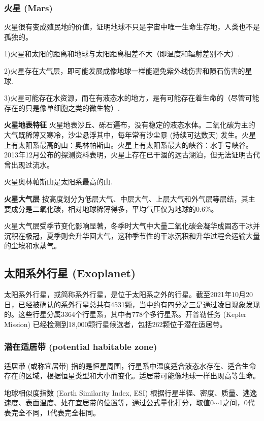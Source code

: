 \documentclass[12pt,a4paper]{article}
\begin{document}
	\subsubsection{火星 (Mars)}
	
	火星很有变成殖民地的价值，证明地球不只是宇宙中唯一生命生存地，人类也不是孤独的。
	
	1)火星和太阳的距离和地球与太阳距离相差不大（即温度和辐射差别不大）.
	
	2)火星存在大气层，即可能发展成像地球一样能避免紫外线伤害和陨石伤害的星球.
	
	3)火星可能存在水资源，而在有液态水的地方，是有可能存在着生命的（尽管可能存在的只是像单细胞之类的微生物）.
	
	\textbf{火星地表特征} 火星地表沙丘、砾石遍布，没有稳定的液态水体。二氧化碳为主的大气既稀薄又寒冷，沙尘悬浮其中，每年常有沙尘暴 (持续可达数天) 发生。火星上有太阳系最高的山：奥林帕斯山。火星上有太阳系最大的峡谷：水手号峡谷。2013年12月公布的探测资料表明，火星上存在已干涸的远古湖泊，但无法证明古代曾出现过流水。
	
	火星奥林帕斯山是太阳系最高的山.
	
	\textbf{火星大气层} 按高度划分为低层大气、中层大气、上层大气和外气层等层结，其主要成分是二氧化碳，相对地球稀薄得多，平均气压仅为地球的0.6\%。
	
	火星大气层受季节变化影响显著，冬季时大气中大量二氧化碳会凝华成固态干冰并沉积在极冠，夏季则会升华回大气，这种季节性的干冰沉积和升华过程会运输大量的尘埃和水蒸气。
	
	\subsection{太阳系外行星 (Exoplanet)}
	
	太阳系外行星，或简称系外行星，是位于太阳系之外的行星。截至2021年10月20日，已经被确认的系外行星总共有4531颗，当中约有四分之三是通过凌日现象发现的。这些行星分属3364个行星系，其中有778个多行星系。开普勒任务 (Kepler Mission) 已经检测到18,000颗行星候选者，包括262颗位于潜在适居带。
	
	\subsubsection{潜在适居带 (potential habitable zone)}
	
	适居带 (或称宜居带) 指的是恒星周围，行星系中温度适合液态水存在、适合生命存在的区域，根据恒星类型和大小而变化。适居带可能像地球一样出现高等生命。
	
	地球相似度指数 (Earth Similarity Index, ESI) 根据行星半径、密度、质量、逃逸速度、表面温度、处在宜居带的位置等，通过公式量化打分，取值0$\sim$1之间，0代表完全不同，1代表完全相同。
	
\end{document}

